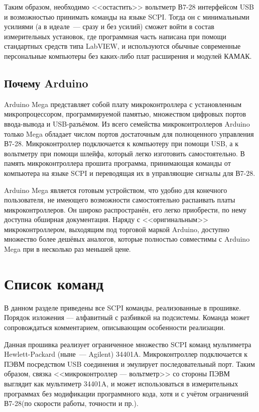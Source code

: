 \documentclass[10pt, a4paper, twocolumn]{article}
\newcommand{\SCPI}{\mbox{SCPI}}
\newcommand{\V}{\mbox{В7-28}}
\begin{document}
Таким образом, необходимо <<остастить>> вольтметр \V{} интерфейсом USB и возможностью принимать команды на языке \SCPI. Тогда он с минимальными усилиями (а в идеале~--- сразу и без усилий) сможет войти в состав измерительных установок, где программная часть написана при помощи стандартных средств типа LabVIEW, и используются обычные современные персональные компьютеры без каких-либо плат расширения и модулей КАМАК.

\subsection{Почему Arduino}

Arduino Mega представляет собой плату микроконтроллера с установленным микропроцессором, программируемой памятью, множеством цифровых портов ввода-вывода и USB-разъёмом. Из всего семейства микроконтроллеров Arduino только Mega обладает числом портов достаточным для полноценного управления \V. Микроконтроллер подключается к компьютеру при помощи USB, а к вольтметру при помощи шлейфа, который легко изготовить самостоятельно.  В память микроконтроллера прошита программа, принимающая команды от компьютера на языке \SCPI{} и переводящая их в управляющие сигналы для \V.

Arduino Mega является готовым устройством, что удобно для конечного пользователя, не имеющего возможности самостоятельно распаивать платы микроконтроллеров. Он широко распространён, его легко приобрести, по нему доступна обширная документация. Наряду с <<оригинальным>> микроконтроллером, выходящим под торговой маркой Arduino, доступно множество более дешёвых аналогов, которые полностью совместимы с Arduino Mega при в несколько раз меньшей цене.

\section{Список команд}

В данном разделе приведены все \SCPI{} команды, реализованные в прошивке. Порядок изложения --- алфавитный с разбивкой на подсистемы. Команда может сопровождаться комментарием, описывающим особенности реализации.

Данная прошивка реализует ограниченное множество \SCPI{} команд мультиметра Hewlett-Packard (ныне~--- Agilent) \mbox{34401A}. Микроконтроллер подключается к ПЭВМ посредством USB соединения и эмулирует последовательный порт. Таким образом, связка <<микроконтроллер --- вольтметр>> со стороны ПЭВМ выглядит как мультиметр \mbox{34401A}, и может использоваться в измерительных программах без модификации программного кода, хотя и с учётом ограничений \V (по скорости работы, точности и пр.).
\end{document}
